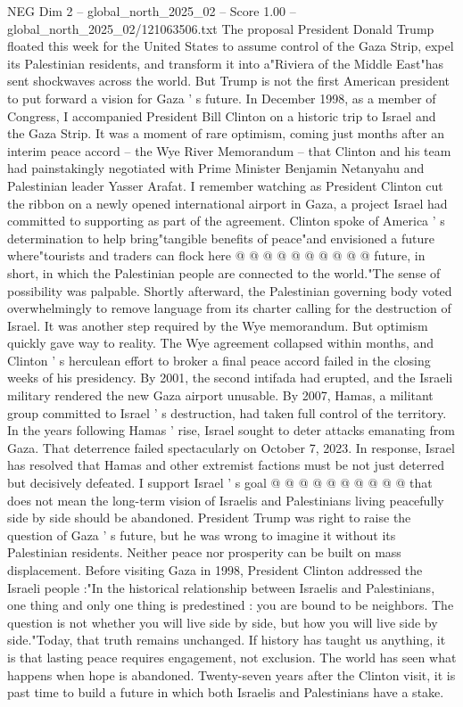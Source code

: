 \begin{textsample}{NEG Dim 2 – global\_north\_2025\_02 – Score 1.00 – global\_north\_2025\_02/121063506.txt}  \label{ex:f2_neg_016}
The proposal President Donald Trump floated this week for the United States to assume control of the Gaza Strip, expel its Palestinian residents, and transform it into a"Riviera of the Middle East"has sent shockwaves across the world.
But Trump is not the first American president to put forward a vision for Gaza ' s future.
In December 1998, as a member of Congress, I accompanied President Bill Clinton on a historic trip to Israel and the Gaza Strip.
It was a moment of rare optimism, coming just months after an interim peace accord -- the Wye River Memorandum -- that Clinton and his team had painstakingly negotiated with Prime Minister Benjamin Netanyahu and Palestinian leader Yasser Arafat.
I remember watching as President Clinton cut the ribbon on a newly opened international airport in Gaza, a project Israel had committed to supporting as part of the agreement.
Clinton spoke of America ' s determination to help bring"tangible benefits of peace"and envisioned a future where"tourists and traders can flock here @ @ @ @ @ @ @ @ @ @ future, in short, in which the Palestinian people are connected to the world."The sense of possibility was palpable.
Shortly afterward, the Palestinian governing body voted overwhelmingly to remove language from its charter calling for the destruction of Israel.
It was another step required by the Wye memorandum.
But optimism quickly gave way to reality.
The Wye agreement collapsed within months, and Clinton ' s herculean effort to broker a final peace accord failed in the closing weeks of his presidency.
By 2001, the second intifada had erupted, and the Israeli military rendered the new Gaza airport unusable.
By 2007, Hamas, a militant group committed to Israel ' s destruction, had taken full control of the territory.
In the years following Hamas ' rise, Israel sought to deter attacks emanating from Gaza.
That deterrence failed spectacularly on October 7, 2023.
In response, Israel has resolved that Hamas and other extremist factions must be not just deterred but decisively defeated.
I support Israel ' s goal @ @ @ @ @ @ @ @ @ @ that does not mean the long-term vision of Israelis and Palestinians living peacefully side by side should be abandoned.
President Trump was right to raise the question of Gaza ' s future, but he was wrong to imagine it without its Palestinian residents.
Neither peace nor prosperity can be built on mass displacement.
Before visiting Gaza in 1998, President Clinton addressed the Israeli people :"In the historical relationship between Israelis and Palestinians, one thing and only one thing is predestined : you are bound to be neighbors.
The question is not whether you will live side by side, but how you will live side by side."Today, that truth remains unchanged.
If history has taught us anything, it is that lasting peace requires engagement, not exclusion.
The world has seen what happens when hope is abandoned.
Twenty-seven years after the Clinton visit, it is past time to build a future in which both Israelis and Palestinians have a stake.

\end{textsample}
